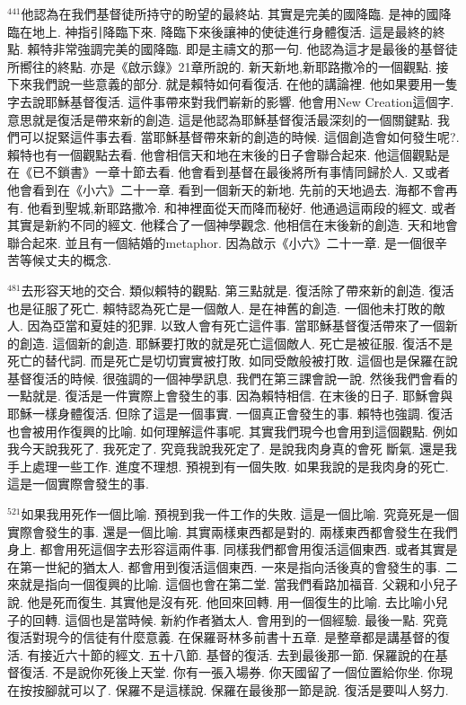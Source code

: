 \documentclass{book}
\begin{document}
$^{441}$他認為在我們基督徒所持守的盼望的最終站.
其實是完美的國降臨.
是神的國降臨在地上.
神指引降臨下來.
降臨下來後讓神的使徒進行身體復活.
這是最終的終點.
賴特非常強調完美的國降臨.
即是主禱文的那一句.
他認為這才是最後的基督徒所嚮往的終點.
亦是《啟示錄》21章所說的.
新天新地,新耶路撒冷的一個觀點.
接下來我們說一些意義的部分.
就是賴特如何看復活.
在他的講論裡.
他如果要用一隻字去說耶穌基督復活.
這件事帶來對我們嶄新的影響.
他會用New Creation這個字.
意思就是復活是帶來新的創造.
這是他認為耶穌基督復活最深刻的一個關鍵點.
我們可以捉緊這件事去看.
當耶穌基督帶來新的創造的時候.
這個創造會如何發生呢?.
賴特也有一個觀點去看.
他會相信天和地在末後的日子會聯合起來.
他這個觀點是在《已不鎖書》一章十節去看.
他會看到基督在最後將所有事情同歸於人.
又或者他會看到在《小六》二十一章.
看到一個新天的新地.
先前的天地過去.
海都不會再有.
他看到聖城,新耶路撒冷.
和神裡面從天而降而秘好.
他通過這兩段的經文.
或者其實是新約不同的經文.
他糅合了一個神學觀念.
他相信在末後新的創造.
天和地會聯合起來.
並且有一個結婚的metaphor.
因為啟示《小六》二十一章.
是一個很辛苦等候丈夫的概念.

$^{481}$去形容天地的交合.
類似賴特的觀點.
第三點就是.
復活除了帶來新的創造.
復活也是征服了死亡.
賴特認為死亡是一個敵人.
是在神舊的創造.
一個他未打敗的敵人.
因為亞當和夏娃的犯罪.
以致人會有死亡這件事.
當耶穌基督復活帶來了一個新的創造.
這個新的創造.
耶穌要打敗的就是死亡這個敵人.
死亡是被征服.
復活不是死亡的替代詞.
而是死亡是切切實實被打敗.
如同受敵般被打敗.
這個也是保羅在說基督復活的時候.
很強調的一個神學訊息.
我們在第三課會說一說.
然後我們會看的一點就是.
復活是一件實際上會發生的事.
因為賴特相信.
在末後的日子.
耶穌會與耶穌一樣身體復活.
但除了這是一個事實.
一個真正會發生的事.
賴特也強調.
復活也會被用作復興的比喻.
如何理解這件事呢.
其實我們現今也會用到這個觀點.
例如我今天說我死了.
我死定了.
究竟我說我死定了.
是說我肉身真的會死 斷氣.
還是我手上處理一些工作.
進度不理想.
預視到有一個失敗.
如果我說的是我肉身的死亡.
這是一個實際會發生的事.

$^{521}$如果我用死作一個比喻.
預視到我一件工作的失敗.
這是一個比喻.
究竟死是一個實際會發生的事.
還是一個比喻.
其實兩樣東西都是對的.
兩樣東西都會發生在我們身上.
都會用死這個字去形容這兩件事.
同樣我們都會用復活這個東西.
或者其實是在第一世紀的猶太人.
都會用到復活這個東西.
一來是指向活後真的會發生的事.
二來就是指向一個復興的比喻.
這個也會在第二堂.
當我們看路加福音.
父親和小兒子說.
他是死而復生.
其實他是沒有死.
他回來回轉.
用一個復生的比喻.
去比喻小兒子的回轉.
這個也是當時候.
新約作者猶太人.
會用到的一個經驗.
最後一點.
究竟復活對現今的信徒有什麼意義.
在保羅哥林多前書十五章.
是整章都是講基督的復活.
有接近六十節的經文.
五十八節.
基督的復活.
去到最後那一節.
保羅說的在基督復活.
不是說你死後上天堂.
你有一張入場券.
你天國留了一個位置給你坐.
你現在按按腳就可以了.
保羅不是這樣說.
保羅在最後那一節是說.
復活是要叫人努力.
\end{document}
